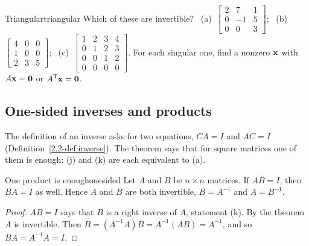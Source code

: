 \documentclass[11pt]{article}
\begin{document}
\begin{kc}{Triangular}{triangular}
Which of these are invertible? \ (a)~$\begin{bmatrix}2&7&1\\0&-1&5\\0&0&3\end{bmatrix}$; \ (b)~$\begin{bmatrix}4&0&0\\1&0&0\\2&3&5\end{bmatrix}$; \ (c)~$\begin{bmatrix}1&2&3&4\\0&1&2&3\\0&0&1&2\\0&0&0&0\end{bmatrix}$. For each singular one, find a nonzero $\mathbf{x}$ with $A\mathbf{x}=\mathbf{0}$ or $A^{\mathsf T}\mathbf{x}=\mathbf{0}$.
\end{kc}

\subsection*{One-sided inverses and products}

The definition of an inverse asks for two equations, $CA=I$ and $AC=I$ (Definition~\ref{2.2-def:inverse}). The theorem says that for square matrices one of them is enough: (j) and (k) are each equivalent to (a).

\begin{thm}{One product is enough}{onesided}
Let $A$ and $B$ be $n\times n$ matrices. If $AB=I$, then $BA=I$ as well. Hence $A$ and $B$ are both invertible, $B=A^{-1}$ and $A=B^{-1}$.
\end{thm}

\begin{proof}
$AB=I$ says that $B$ is a right inverse of $A$, statement (k). By the theorem $A$ is invertible. Then $B=(A^{-1}A)B=A^{-1}(AB)=A^{-1}$, and so $BA=A^{-1}A=I$.
\end{proof}
\end{document}
